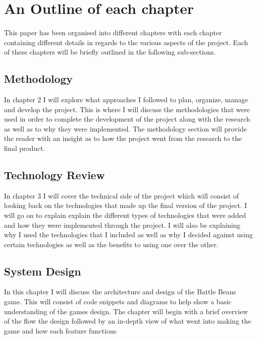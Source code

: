 \section{An Outline of each chapter}

\paragraph{} This paper has been organised into different chapters with each chapter containing different details in regards to the various aspects of the project. Each of these chapters will be briefly outlined in the following sub-sections.

\subsection{Methodology}
In chapter 2 I will explore what approaches I followed to plan, organize, manage and develop the project. This is where I will discuss the methodologies that were used in order to complete the development of the project along with the research as well as to why they were implemented. The methodology section will provide the reader with an insight as to how the project went from the research to the final product.

\subsection{Technology Review}
In chapter 3 I will cover the technical side of the project which will consist of looking back on the technologies that made up the final version of the project. I will go on to explain explain the different types of technologies that were added and how they were implemented through the project. I will also be explaining why I used the technologies that I included as well as why I decided against using certain technologies as well as the benefits to using one over the other.

\subsection{System Design}
In this chapter I will discuss the architecture and design of the Battle Beans game. This will consist of code snippets and diagrams to help show a basic understanding of the games design. The chapter will begin with a brief overview of the flow the design followed by an in-depth view of what went into making the game and how each feature functions

